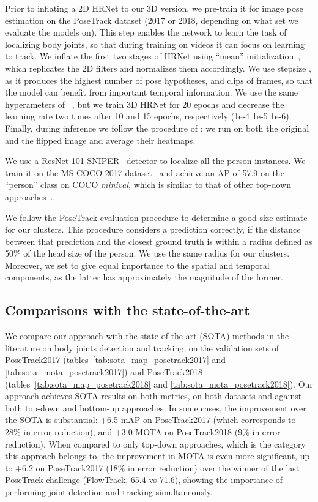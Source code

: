 \documentclass[10pt,twocolumn,letterpaper]{article}
\begin{document}
Prior to inflating a 2D HRNet to our 3D version, we pre-train it for image pose estimation on the PoseTrack dataset (2017 or 2018, depending on what set we evaluate the models on). This step enables the network to learn the task of localizing body joints, so that during training on videos it can focus on learning to track. We inflate the first two stages of HRNet using ``mean'' initialization~\cite{carreira2017quo, feichtenhofer2016spatiotemporal, girdhar2018detecttrack}, which replicates the 2D filters and normalizes them accordingly. We use stepsize , as it produces the highest number of pose hypotheses, and clips of  frames, so that the model can benefit from important temporal information. 
We use the same hyperameters of ~\cite{sun2019deep}, but we train 3D HRNet for 20 epochs and decrease the learning rate two times after 10 and 15 epochs, respectively (1e-4  1e-5  1e-6). Finally, during inference we follow the procedure of \cite{sun2019deep, xiao2018simple}: we run on both the original and the flipped image and average their heatmaps. 


 We use a ResNet-101 SNIPER~\cite{singh18nips} detector to localize all the person instances. We train it on the MS COCO 2017 dataset~\cite{lin2014microsoft} and achieve an AP of 57.9 on the ``person'' class on COCO {\it minival}, which is similar to that of other top-down approaches~\cite{xiao2018simple,yu2018multi}.

 We follow the PoseTrack evaluation procedure to determine a good size estimate for our clusters. This procedure considers a prediction correctly, if the  distance between that prediction and the closest ground truth is within a radius defined as 50\% of the head size of the person. We use the same radius for our clusters. Moreover, we set  to give equal importance to the spatial and temporal components, as the latter has approximately  the magnitude of the former.




\subsection{Comparisons with the state-of-the-art} \label{sec:sota}
We compare our approach with the state-of-the-art (SOTA) methods in the literature on body joints detection and tracking, on the validation sets of PoseTrack2017 (tables~\ref{tab:sota_map_posetrack2017} and \ref{tab:sota_mota_posetrack2017}) and PoseTrack2018 (tables~\ref{tab:sota_map_posetrack2018} and \ref{tab:sota_mota_posetrack2018}).
Our approach achieves SOTA results on both metrics, on both datasets and against both top-down and bottom-up approaches. In some cases, the improvement over the SOTA is substantial: +6.5 mAP on PoseTrack2017 (which corresponds to 28\% in error reduction), and +3.0 MOTA on PoseTrack2018 (9\% in error reduction). When compared to only top-down approaches, which is the category this approach belongs to, the improvement in MOTA is even more significant, up to +6.2 on PoseTrack2017 (18\% in error reduction) over the winner of the last PoseTrack challenge (FlowTrack, 65.4 vs 71.6), showing the importance of performing joint detection and tracking simultaneously. 
\end{document}
